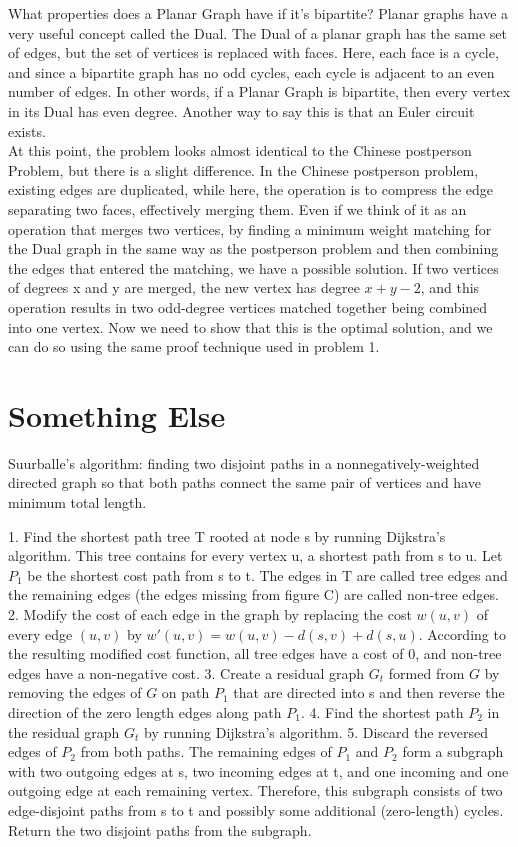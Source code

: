\begin{itemize}
What properties does a Planar Graph have if it's bipartite? Planar graphs have a very useful concept called the Dual. The Dual of a planar graph has the same set of edges, but the set of vertices is replaced with faces. Here, each face is a cycle, and since a bipartite graph has no odd cycles, each cycle is adjacent to an even number of edges. In other words, if a Planar Graph is bipartite, then every vertex in its Dual has even degree. Another way to say this is that an Euler circuit exists.\\
At this point, the problem looks almost identical to the Chinese postperson Problem, but there is a slight difference. In the Chinese postperson problem, existing edges are duplicated, while here, the operation is to compress the edge separating two faces, effectively merging them. Even if we think of it as an operation that merges two vertices, by finding a minimum weight matching for the Dual graph in the same way as the postperson problem and then combining the edges that entered the matching, we have a possible solution. If two vertices of degrees x and y are merged, the new vertex has degree $x+y-2$, and this operation results in two odd-degree vertices matched together being combined into one vertex. Now we need to show that this is the optimal solution, and we can do so using the same proof technique used in problem 1.
\end{itemize}

\section{Something Else}
Suurballe's algorithm: finding two disjoint paths in a nonnegatively-weighted directed graph so that both paths connect the same pair of vertices and have minimum total length.

1. Find the shortest path tree T rooted at node s by running Dijkstra's algorithm. This tree contains for every vertex u, a shortest path from s to u. Let $P_1$ be the shortest cost path from s to t. The edges in T are called tree edges and the remaining edges (the edges missing from figure C) are called non-tree edges.
2. Modify the cost of each edge in the graph by replacing the cost $w(u,v)$ of every edge $(u,v)$ by $w'(u, v) = w(u, v) - d(s, v) + d(s, u)$. According to the resulting modified cost function, all tree edges have a cost of 0, and non-tree edges have a non-negative cost.
3. Create a residual graph $G_t$ formed from $G$ by removing the edges of $G$ on path $P_1$ that are directed into s and then reverse the direction of the zero length edges along path $P_1$.
4. Find the shortest path $P_2$ in the residual graph $G_t$ by running Dijkstra's algorithm.
5. Discard the reversed edges of $P_2$ from both paths. The remaining edges of $P_1$ and $P_2$ form a subgraph with two outgoing edges at s, two incoming edges at t, and one incoming and one outgoing edge at each remaining vertex. Therefore, this subgraph consists of two edge-disjoint paths from s to t and possibly some additional (zero-length) cycles. Return the two disjoint paths from the subgraph.
